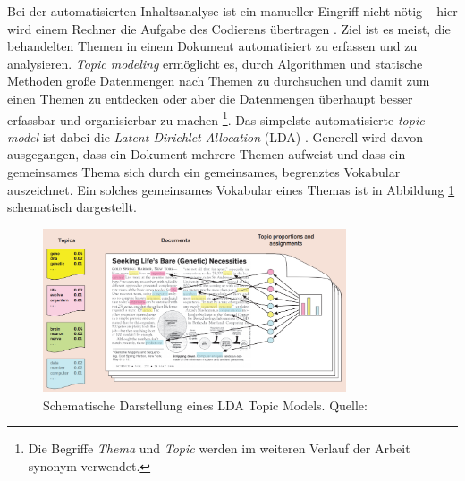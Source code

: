 \documentclass[12pt, 
    twoside=false, 
    bibliography=totoc, 
    numbers=endperiod, 
    headings=normal, 
    toc=chapterentrydotfill
    ]{scrbook}
\begin{document}
Bei der automatisierten Inhaltsanalyse ist ein manueller Eingriff nicht nötig -- hier wird einem Rechner die Aufgabe des Codierens übertragen \parencite[161]{brosius_2012}. Ziel ist es meist, die behandelten Themen in einem Dokument automatisiert zu erfassen \parencite[36f.]{niekler_2018} und zu analysieren. \emph{Topic modeling} ermöglicht es, durch Algorithmen und statische Methoden große Datenmengen nach Themen zu durchsuchen und damit zum einen Themen zu entdecken oder aber die Datenmengen überhaupt besser erfassbar und organisierbar zu machen \parencites[vgl.][77ff.]{blei_2012}[vgl.][163]{brosius_2012}\footnote{Die Begriffe \emph{Thema} und \emph{Topic} werden im weiteren Verlauf der Arbeit synonym verwendet.}. Das simpelste automatisierte \emph{topic model} ist dabei die \emph{Latent Dirichlet Allocation} (LDA) \parencite[78]{blei_2012}. Generell wird davon ausgegangen, dass ein Dokument mehrere Themen aufweist \parencites[78]{blei_2012}[88]{niekler_2018} und dass ein gemeinsames Thema sich durch ein gemeinsames, begrenztes Vokabular auszeichnet.
Ein solches gemeinsames Vokabular eines Themas ist in Abbildung \ref{fig:lda_example} schematisch dargestellt.

\begin{figure}
    \centering
    \includegraphics[width=0.8\textwidth]{document/images/lda_topic_model.png}
    \caption[Schematische Darstellung eines LDA Topic Models]{Schematische Darstellung eines LDA Topic Models. Quelle:  \parencite{blei_2012}}
    \label{fig:lda_example}
\end{figure}
\end{document}
